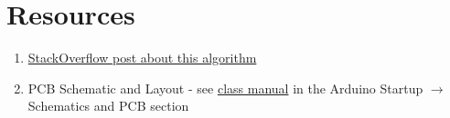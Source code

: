 \section{Resources}\label{sec:distmotorservoresources}
\begin{enumerate}
    \item \href{https://stackoverflow.com/a/22640362}{StackOverflow post about this algorithm}
    \item PCB Schematic and Layout - see 
            \href{https://github.com/semcneil/Fundamentals-of-Microcontrollers-Manual}{class manual} 
            in the Arduino Startup $\rightarrow$ Schematics and PCB section
\end{enumerate}

